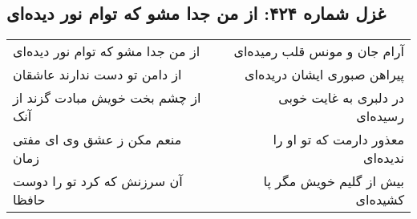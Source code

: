 \begin{center}
\section*{غزل شماره ۴۲۴: از من جدا مشو که توام نور دیده‌ای}
\label{sec:sh424}
\begin{longtable}{l p{0.5cm} r}
از من جدا مشو که توام نور دیده‌ای
&&
آرام جان و مونس قلب رمیده‌ای
\\
از دامن تو دست ندارند عاشقان
&&
پیراهن صبوری ایشان دریده‌ای
\\
از چشم بخت خویش مبادت گزند از آنک
&&
در دلبری به غایت خوبی رسیده‌ای
\\
منعم مکن ز عشق وی ای مفتی زمان
&&
معذور دارمت که تو او را ندیده‌ای
\\
آن سرزنش که کرد تو را دوست حافظا
&&
بیش از گلیم خویش مگر پا کشیده‌ای
\\
\end{longtable}
\end{center}
